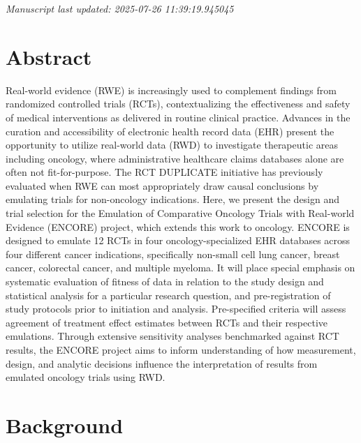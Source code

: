 \documentclass[
  letterpaper,
  DIV=11,
  numbers=noendperiod]{scrartcl}
\begin{document}
\emph{Manuscript last updated: 2025-07-26 11:39:19.945045}

\newpage{}

\section*{Abstract}\label{abstract}

Real-world evidence (RWE) is increasingly used to complement findings
from randomized controlled trials (RCTs), contextualizing the
effectiveness and safety of medical interventions as delivered in
routine clinical practice. Advances in the curation and accessibility of
electronic health record data (EHR) present the opportunity to utilize
real-world data (RWD) to investigate therapeutic areas including
oncology, where administrative healthcare claims databases alone are
often not fit-for-purpose. The RCT DUPLICATE initiative has previously
evaluated when RWE can most appropriately draw causal conclusions by
emulating trials for non-oncology indications. Here, we present the
design and trial selection for the Emulation of Comparative Oncology
Trials with Real-world Evidence (ENCORE) project, which extends this
work to oncology. ENCORE is designed to emulate 12 RCTs in four
oncology-specialized EHR databases across four different cancer
indications, specifically non-small cell lung cancer, breast cancer,
colorectal cancer, and multiple myeloma. It will place special emphasis
on systematic evaluation of fitness of data in relation to the study
design and statistical analysis for a particular research question, and
pre-registration of study protocols prior to initiation and analysis.
Pre-specified criteria will assess agreement of treatment effect
estimates between RCTs and their respective emulations. Through
extensive sensitivity analyses benchmarked against RCT results, the
ENCORE project aims to inform understanding of how measurement, design,
and analytic decisions influence the interpretation of results from
emulated oncology trials using RWD.

\newpage{}

\section{Background}\label{background}
\end{document}
